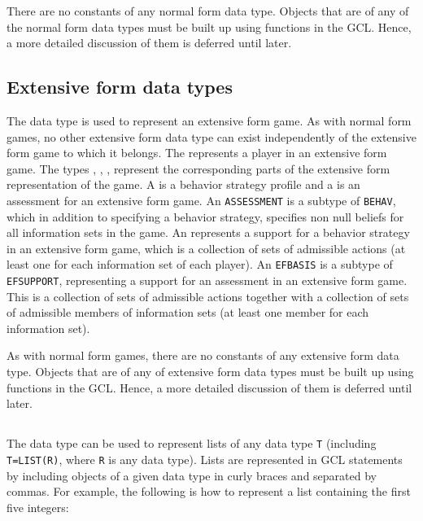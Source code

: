 There are no constants of any normal form data type.  Objects that are
of any of the normal form data types must be built up using functions
in the GCL.  Hence, a more detailed discussion of them is deferred
until later.  

\subsection{Extensive form data types}
The data type  is used to represent an extensive form
game.  As with normal form games, no other extensive form data type
can exist independently of the extensive form game to which it
belongs.  The  represents a player in an extensive
form game.  The types , ,
,  represent the corresponding parts
of the extensive form representation of the game.  A  is
a behavior strategy profile and a  is an assessment
for an extensive form game. An \verb+ASSESSMENT+ is a subtype of
\verb+BEHAV+, which in addition to specifying a behavior strategy,
specifies non null beliefs for all information sets in the game.  An
 represents a support for a behavior strategy in an
extensive form game, which is a collection of sets of admissible
actions (at least one for each information set of each player).  An
\verb+EFBASIS+ is a subtype of \verb+EFSUPPORT+, representing a
support for an assessment in an extensive form game. This is a
collection of sets of admissible actions together with a collection of
sets of admissible members of information sets (at least one member
for each information set).

As with normal form games, there are no constants of any extensive form
data type.  Objects that are of any of extensive form data types must
be built up using functions in the GCL.  Hence, a more detailed
discussion of them is deferred until later.

\subsection{}

The  data type can be used to represent lists of any
data type \verb+T+ (including \verb+T=LIST(R)+, where \verb+R+ is any
data type).  Lists are represented in GCL statements by including
objects of a given data type in curly braces and separated by commas.
For example, the following is how to represent a list containing the
first five integers:

